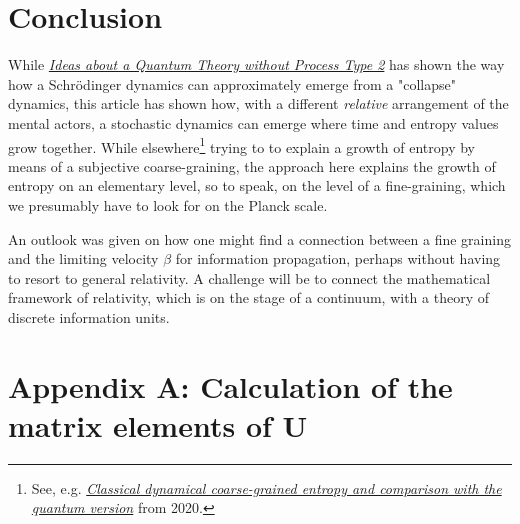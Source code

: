 \documentclass[12pt]{article}
\begin{document}



\section{Conclusion}

While \emph{\href{https://docs.google.com/document/d/1OrmVETmnBSe5c0CpTbKH8Vq5pWFuB8QUez-KqHTaarQ/edit?usp=sharing}{Ideas about a Quantum Theory without Process Type 2}} has shown the way how a Schrödinger dynamics can approximately emerge from a "collapse" dynamics, this article has shown how, with a different \emph{relative} arrangement of the mental actors, a stochastic dynamics can emerge where time and entropy values grow together. While elsewhere\footnote{See, e.g. \emph{\href{https://arxiv.org/abs/1905.03841}{Classical dynamical coarse-grained entropy and comparison with the quantum version}} from 2020.}  trying to to explain a growth of entropy by means of a subjective coarse-graining, the approach here explains the growth of entropy on an elementary level, so to speak, on the level of a fine-graining, which we presumably have to look for on the Planck scale.

An outlook was given on how one might find a connection between a fine graining and the limiting velocity $\beta$ for information propagation, perhaps without having to resort to general relativity. A challenge will be to connect the mathematical framework of relativity, which is on the stage of a continuum, with a theory of discrete information units.

\newpage
\section{Appendix A: Calculation of the matrix elements of U}
\end{document}
